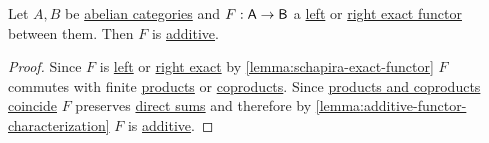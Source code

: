 \documentclass[../../../main]{subfiles}
\begin{document}
\begin{lemma}\label{lemma:exact-is-additive}
  Let \(A, B\) be \hyperref[def:abelian-category]{abelian categories} and \(F: \mathsf{A} \to \mathsf{B}\) a \hyperref[def:exact-complex-functor]{left} or \hyperref[def:exact-complex-functor]{right exact functor} between them.
  Then \(F\) is \hyperref[def:additive-functor]{additive}.
\end{lemma}
\begin{proof}
  Since \(F\) is \hyperref[def:exact-complex-functor]{left} or \hyperref[def:exact-complex-functor]{right exact} by \autoref{lemma:schapira-exact-functor} \(F\) commutes with finite \hyperref[def:categorical-product]{products} or \hyperref[def:categorical-coproduct]{coproducts}.
  Since \hyperref[lemma:products-coproducts-additive]{products and coproducts coincide} \(F\) preserves \hyperref[def:direct-sum]{direct sums} and therefore by \autoref{lemma:additive-functor-characterization} \(F\) is \hyperref[def:additive-functor]{additive}.
\end{proof}
\end{document}
